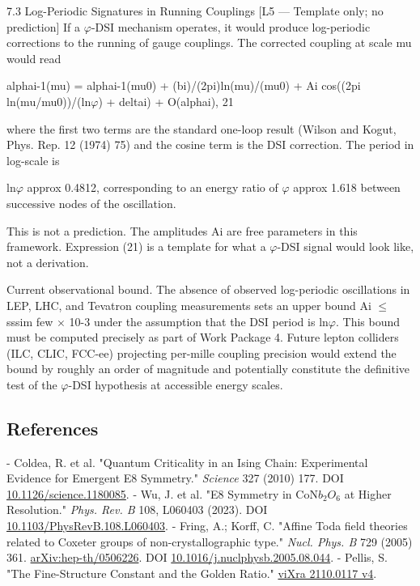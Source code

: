   7.3 Log-Periodic Signatures in Running Couplings [L5 --- Template
  only; no prediction]
  If a $\varphi$-DSI mechanism operates, it would produce log-periodic corrections to the
  running of gauge couplings. The corrected coupling at scale mu would read

  alphai-1(mu) = alphai-1(mu0) + (bi)/(2pi)ln(mu)/(mu0) + Ai cos((2pi ln(mu/mu0))/(ln$\varphi$)
  + deltai) + O(alphai), 21

  where the first two terms are the standard one-loop result (Wilson and Kogut, Phys.
  Rep. 12 (1974) 75) and the cosine term is the DSI correction. The period in log-scale is

  ln$\varphi$ approx 0.4812, corresponding to an energy ratio of $\varphi$ approx 1.618 between
  successive nodes of the oscillation.

  This is not a prediction. The amplitudes Ai are free parameters in this framework.
  Expression (21) is a template for what a $\varphi$-DSI signal would look like, not a derivation.

  Current observational bound. The absence of observed log-periodic oscillations in LEP,
  LHC, and Tevatron coupling measurements sets an upper bound Ai $\leq$sssim few $\times$ 10-3
  under the assumption that the DSI period is ln$\varphi$. This bound must be computed
  precisely as part of Work Package 4. Future lepton colliders (ILC, CLIC, FCC-ee)
  projecting per-mille coupling precision would extend the bound by roughly an order of
  magnitude and potentially constitute the definitive test of the $\varphi$-DSI hypothesis at
  accessible energy scales.

\subsection{References}

- Coldea, R. et al. "Quantum Criticality in an Ising Chain: Experimental Evidence for Emergent E8 Symmetry." \textit{Science} 327 (2010) 177. DOI \href{https://doi.org/10.1126/science.1180085}{10.1126/science.1180085}.
- Wu, J. et al. "E8 Symmetry in CoN$b_{2}$$O_{6}$ at Higher Resolution." \textit{Phys. Rev. B} 108, L060403 (2023). DOI \href{https://doi.org/10.1103/PhysRevB.108.L060403}{10.1103/PhysRevB.108.L060403}.
- Fring, A.; Korff, C. "Affine Toda field theories related to Coxeter groups of non-crystallographic type." \textit{Nucl. Phys. B} 729 (2005) 361. \href{https://arxiv.org/abs/hep-th/0506226}{arXiv:hep-th/0506226}. DOI \href{https://doi.org/10.1016/j.nuclphysb.2005.08.044}{10.1016/j.nuclphysb.2005.08.044}.
- Pellis, S. "The Fine-Structure Constant and the Golden Ratio." \href{https://vixra.org/pdf/2110.0117v4.pdf}{viXra 2110.0117 v4}.
